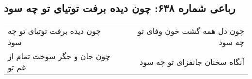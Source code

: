 \begin{center}
\section*{رباعی شماره ۶۳۸: چون دیده برفت توتیای تو چه سود}
\label{sec:0638}
\begin{longtable}{l p{0.5cm} r}
چون دیده برفت توتیای تو چه سود
&&
چون دل همه گشت خون وفای تو چه سود
\\
چون جان و جگر سوخت تمام از غم تو
&&
آنگاه سخنان جانفزای تو چه سود
\\
\end{longtable}
\end{center}
